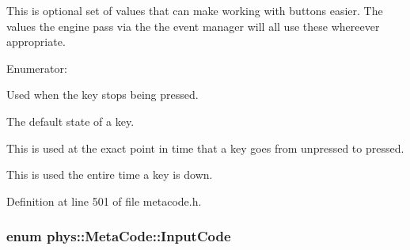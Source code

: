 This is optional set of values that can make working with buttons easier. The values the engine pass via the the event manager will all use these whereever appropriate. \begin{Desc}
\item[Enumerator: ]\par
\begin{description}
\item[{\em 
\hypertarget{classphys_1_1MetaCode_a2fdfb26b3e50ceb0ccc60bfc4c3d6ac2a6b5564408703517f36debd8c423e2dee}{
BUTTON\_\-LIFTING}
\label{da/dc9/classphys_1_1MetaCode_a2fdfb26b3e50ceb0ccc60bfc4c3d6ac2a6b5564408703517f36debd8c423e2dee}
}]Used when the key stops being pressed. \item[{\em 
\hypertarget{classphys_1_1MetaCode_a2fdfb26b3e50ceb0ccc60bfc4c3d6ac2ae275c52779b0f6ec37533af256a70cc3}{
BUTTON\_\-UP}
\label{da/dc9/classphys_1_1MetaCode_a2fdfb26b3e50ceb0ccc60bfc4c3d6ac2ae275c52779b0f6ec37533af256a70cc3}
}]The default state of a key. \item[{\em 
\hypertarget{classphys_1_1MetaCode_a2fdfb26b3e50ceb0ccc60bfc4c3d6ac2a33669b2b9ca814664296da55702e412d}{
BUTTON\_\-PRESSING}
\label{da/dc9/classphys_1_1MetaCode_a2fdfb26b3e50ceb0ccc60bfc4c3d6ac2a33669b2b9ca814664296da55702e412d}
}]This is used at the exact point in time that a key goes from unpressed to pressed. \item[{\em 
\hypertarget{classphys_1_1MetaCode_a2fdfb26b3e50ceb0ccc60bfc4c3d6ac2a5b52ee1db94dbc2db23f3b4c267b5438}{
BUTTON\_\-DOWN}
\label{da/dc9/classphys_1_1MetaCode_a2fdfb26b3e50ceb0ccc60bfc4c3d6ac2a5b52ee1db94dbc2db23f3b4c267b5438}
}]This is used the entire time a key is down. \end{description}
\end{Desc}



Definition at line 501 of file metacode.h.

\hypertarget{classphys_1_1MetaCode_a3e501cbb5bf0f6f1fdb7211465bda8d8}{
\subsubsection[{InputCode}]{\setlength{\rightskip}{0pt plus 5cm}enum {\bf phys::MetaCode::InputCode}}}
\label{da/dc9/classphys_1_1MetaCode_a3e501cbb5bf0f6f1fdb7211465bda8d8}


